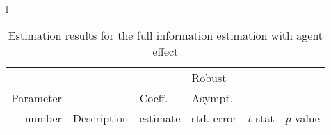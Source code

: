 \documentclass[12pt,a4paper]{article}
\begin{document}
 \begin{table}[htb]
\caption{\label{tab:fi-sc}Estimation results for the full information
  estimation with agent effect}
  \begin{tabular}{l}
\begin{tabular}{rlr@{.}lr@{.}lr@{.}lr@{.}l}
         &                       &   \multicolumn{2}{l}{}    & \multicolumn{2}{l}{Robust}  &     \multicolumn{4}{l}{}   \\
Parameter &                       &   \multicolumn{2}{l}{Coeff.}      & \multicolumn{2}{l}{Asympt.}  &     \multicolumn{4}{l}{}   \\
number &  Description                     &   \multicolumn{2}{l}{estimate}      & \multicolumn{2}{l}{std. error}  &   \multicolumn{2}{l}{$t$-stat}  &   \multicolumn{2}{l}{$p$-value}   \\

\hline


\end{tabular}
\end{tabular}
\end{table}
\end{document}

